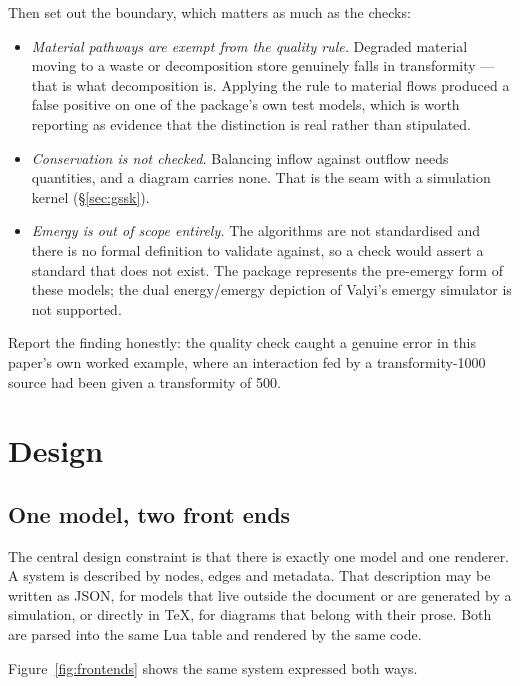 Then set out the boundary, which matters as much as the checks:

\begin{itemize}
  \item \emph{Material pathways are exempt from the quality rule.} Degraded
        material moving to a waste or decomposition store genuinely falls in
        transformity --- that is what decomposition is. Applying the rule to
        material flows produced a false positive on one of the package's own
        test models, which is worth reporting as evidence that the distinction
        is real rather than stipulated.
  \item \emph{Conservation is not checked.} Balancing inflow against outflow
        needs quantities, and a diagram carries none. That is the seam with a
        simulation kernel (\S\ref{sec:gssk}).
  \item \emph{Emergy is out of scope entirely.} The algorithms are not
        standardised and there is no formal definition to validate against, so
        a check would assert a standard that does not exist. The package
        represents the pre-emergy form of these models; the dual energy/emergy
        depiction of Valyi's emergy simulator is not supported.
\end{itemize}

Report the finding honestly: the quality check caught a genuine error in this
paper's own worked example, where an interaction fed by a transformity-1000
source had been given a transformity of 500.

\section{Design}
\label{sec:design}

\subsection{One model, two front ends}

The central design constraint is that there is exactly one model and one
renderer. A system is described by nodes, edges and metadata. That description
may be written as JSON, for models that live outside the document or are
generated by a simulation, or directly in \TeX, for diagrams that belong with
their prose. Both are parsed into the same Lua table and rendered by the same
code.

Figure~\ref{fig:frontends} shows the same system expressed both ways.

